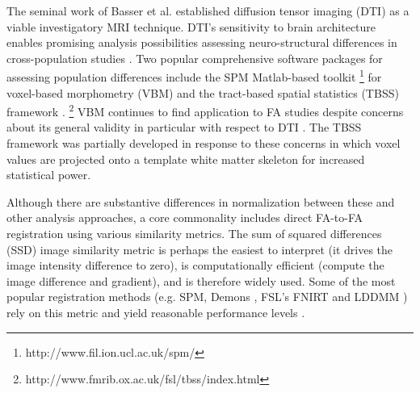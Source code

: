 \documentclass[final,5p,times,twocolumn]{elsarticle}
\begin{document}

The seminal work of Basser et al. \citep{Basser1994a,Basser1994} established diffusion tensor imaging (DTI) as a viable investigatory MRI technique.  DTI's sensitivity to brain architecture \citep{Basser1996,Assaf2008} enables promising analysis possibilities assessing neuro-structural differences in cross-population studies \citep{Kubicki2005,Arnone2008,Kantarci2010,Rametti2010}.
Two popular comprehensive software packages for assessing population differences include the SPM Matlab-based toolkit%
\footnote{
http://www.fil.ion.ucl.ac.uk/spm/
}
for voxel-based morphometry (VBM)
and the tract-based spatial statistics (TBSS) framework \citep{Smith2006}.%
\footnote{
http://www.fmrib.ox.ac.uk/fsl/tbss/index.html
} 
VBM \citep{Ashburner2001} continues to find application to FA studies
\citep{Kakeda2010,Takao2010,Preziosa2011} despite concerns about its
general validity \citep{Bookstein2001,Davatzikos2004} in particular with respect to DTI \citep{Jones2005,Chung2008}.  The TBSS framework was partially developed in response to these concerns in which voxel values are projected onto a template white matter skeleton for increased statistical power.  

Although there are substantive differences in normalization
between these and other analysis approaches, a core
commonality includes direct FA-to-FA registration using various similarity metrics.  The sum of squared differences (SSD) image similarity metric is perhaps the easiest to interpret (it drives the image intensity difference to zero), is computationally efficient (compute the image difference and gradient), and is therefore widely used.  Some of the most popular registration methods (e.g. SPM, 
Demons \cite{Thirion1998}, FSL's FNIRT and LDDMM \citep{Beg2005}) rely on this metric and yield reasonable performance levels \citep{Klein2009}.%
\end{document}
